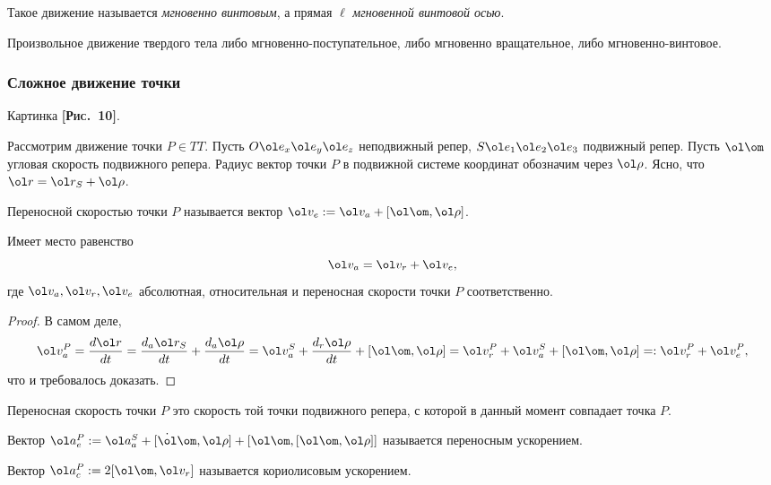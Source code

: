 \documentclass[a4paper,12pt]{article}
\def\w{\ol\om}
\def\p{\ol\rho}
\def\a{\ol a}
\def\r{\ol r}
\def\v{\ol v}
\def\e{\ol e}
\def\d{\dot}
\def\pic#1{ \hbox{\textbf{\textsc{[Рис.~#1]}}}}
\begin{document}
\begin{df}
Такое движение называется \emph{мгновенно винтовым}, а прямая $\ell$ \emph{мгновенной винтовой осью}.
\end{df}


\begin{theorem}
Произвольное движение твердого тела либо
мгновенно-поступательное, либо мгновенно вращательное, либо
мгновенно-винтовое.
\end{theorem}

\subsubsection{Сложное движение точки}

Картинка \pic{10}.

Рассмотрим движение точки $P \in TT$.
Пусть $O\e_x\e_y\e_z$ неподвижный репер, $S\e_1\e_2\e_3$ подвижный репер.
Пусть $\w$ угловая скорость подвижного репера.
Радиус вектор точки $P$ в подвижной системе координат обозначим через $\p$.
Ясно, что $\r=\r_S+\p$.

\begin{df}
Переносной скоростью точки $P$ называется вектор $\v_e := \v_a + [\w,\p]$.
\end{df}

\begin{theorem}
Имеет место равенство
$$\v_a=\v_r+\v_e,$$
где $\v_a,\v_r,\v_e$ абсолютная, относительная и переносная
скорости точки $P$ соответственно.
\end{theorem}
\begin{proof}
В самом деле,
$$\v_a^P=\frac{d\r}{dt}=\frac{d_a\r_S}{dt}+\frac{d_a\p}{dt}=
\v_a^S+\frac{d_r\p}{dt}+[\w,\p]=\v_r^P+\v_a^S+[\w,\p]=: \v_r^P+\v_e^P,$$
что и требовалось доказать.
\end{proof}

\begin{note}
Переносная скорость точки $P$ это скорость той точки подвижного репера,
с которой в данный момент совпадает точка $P$.
\end{note}

\begin{df}
Вектор $\a_e^P := \a_a^S+[\d\w,\p]+[\w,[\w,\p]]$ называется переносным ускорением.
\end{df}

\begin{df}
Вектор $\a^P_c := 2[\w,\v_r]$ называется кориолисовым ускорением.
\end{df}
\end{document}

